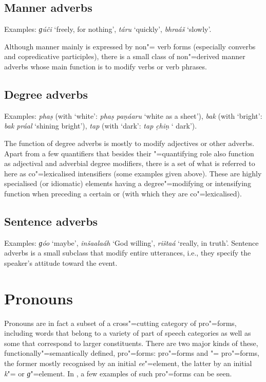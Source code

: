 \subsection{Manner adverbs}
\label{subsec:3b-5-3}
Examples: \textit{ɡúči} `freely, for nothing', \textit{táru} `quickly', \textit{bhraáš} `slowly'.


Although manner mainly is expressed by non"= verb forms (especially converbs and copredicative participles), there is a small class of non"=derived manner adverbs whose main function is to modify verbs or verb phrases.


\subsection{Degree adverbs}
\label{subsec:3b-5-4}
Examples: \textit{phaṣ} (with `white': \textit{phaṣ paṇáaru} `white as a sheet'), \textit{bak} (with `bright': \textit{bak práal} `shining bright'), \textit{tap} (with `dark': \textit{tap c̣hiṇ} ` dark').


The function of degree adverbs is mostly to modify adjectives or other adverbs. Apart from a few quantifiers that besides their "=quantifying role also function as adjectival and adverbial degree modifiers, there is a set of what is referred to here as co"=lexicalised intensifiers (some examples given above). These are highly specialised (or idiomatic) elements having a degree"=modifying or intensifying function when preceding a certain  or  (with which they are co"=lexicalised). 


\subsection{Sentence adverbs}
\label{subsec:3b-5-5}
Examples: \textit{ɡóo} `maybe', \textit{inšaalaáh} `God willing', \textit{rištaá} `really, in truth'.
Sentence adverbs is a small subclass that modify entire utterances, i.e., they specify the speaker’s attitude toward the event.


\section{Pronouns}
\label{sec:3b-6}
Pronouns are in fact a subset of a cross"=cutting category of pro"=forms, including words that belong to a variety of part of speech categories as well as some that correspond to larger constituents. There are two major kinds of these, functionally"=semantically defined, pro"=forms:  pro"=forms and "= pro"=forms, the former mostly recognised by an initial \textit{ee}"=element, the latter by an initial \textit{k}"= or \textit{ɡ}"=element. In , a few examples of such pro"=forms can be seen.


